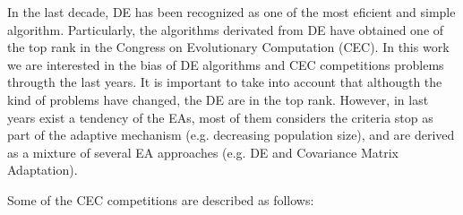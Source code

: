 In the last decade, DE has been recognized as one of the most eficient and simple algorithm.
%
Particularly, the algorithms derivated from DE have obtained one of the top rank in the Congress on Evolutionary Computation (CEC).
%
In this work we are interested in the bias of DE algorithms and CEC competitions problems througth the last years.
%
It is important to take into account that althougth the kind of problems have changed, the DE are in the top rank.
%
However, in last years exist a tendency of the EAs, most of them considers the criteria stop as part of the adaptive mechanism (e.g. decreasing population size), and are derived as a mixture of several EA approaches (e.g. DE and Covariance Matrix Adaptation).
%

Some of the CEC competitions are described as follows:

